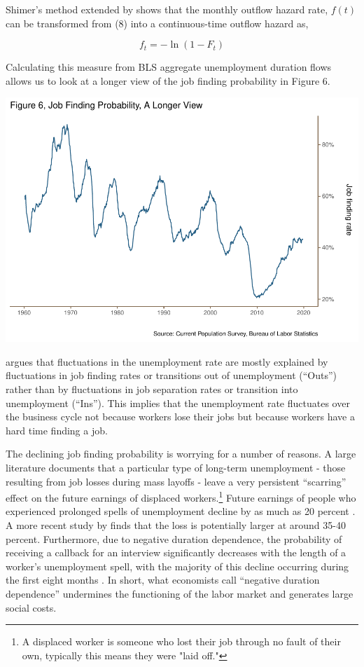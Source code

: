 \documentclass[
  11pt,
]{article}
\begin{document}
Shimer's method extended by \cite{elsby13} shows that the monthly
outflow hazard rate, \(f(t)\) can be transformed from (8) into a
continuous-time outflow hazard as,

\begin{equation}
f_{t} = - \ln(1 - F_{t})
\end{equation}

Calculating this measure from BLS aggregate unemployment duration flows
allows us to look at a longer view of the job finding probability in
Figure 6.

\begin{center}\includegraphics{JOLTS_files/figure-latex/unnamed-chunk-10-1} \end{center}

\cite{Shimer12} argues that fluctuations in the unemployment rate are
mostly explained by fluctuations in job finding rates or transitions out
of unemployment (``Outs'') rather than by fluctuations in job separation
rates or transition into unemployment (``Ins''). This implies that the
unemployment rate fluctuates over the business cycle not because workers
lose their jobs but because workers have a hard time finding a job.

The declining job finding probability is worrying for a number of
reasons. A large literature documents that a particular type of
long-term unemployment - those resulting from job losses during mass
layoffs - leave a very persistent ``scarring'' effect on the future
earnings of displaced
workers.\footnote{A displaced worker is someone who lost their job through no fault of their own, typically this means they were "laid off."}
Future earnings of people who experienced prolonged spells of
unemployment decline by as much as 20 percent \cite{davis10}. A more
recent study by \cite{Guvenen17} finds that the loss is potentially
larger at around 35-40 percent. Furthermore, due to negative duration
dependence, the probability of receiving a callback for an interview
significantly decreases with the length of a worker's unemployment
spell, with the majority of this decline occurring during the first
eight months \cite{kroft13}. In short, what economists call ``negative
duration dependence'' undermines the functioning of the labor market and
generates large social costs.
\end{document}
